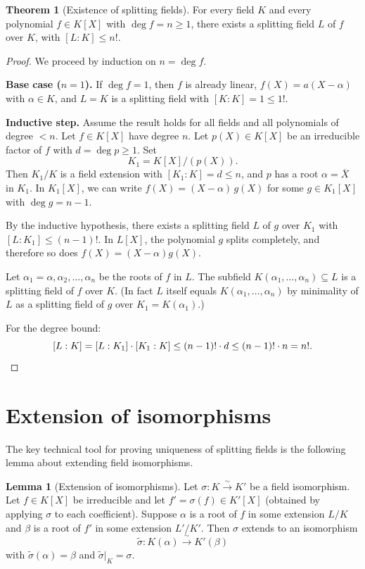 \documentclass[12pt,a4paper,openany]{book}
\theoremstyle{definition}
\newtheorem{theorem}{Theorem}[chapter]
\newtheorem{lemma}{Lemma}[chapter]
\theoremstyle{remark}
\renewcommand{\deg}{\operatorname{deg}}
\begin{document}
\begin{theorem}[Existence of splitting fields]
\label{thm:splitting-existence}
For every field $K$ and every polynomial $f \in K[X]$ with
$\deg f = n \ge 1$, there exists a splitting field $L$ of $f$ over
$K$, with $[L:K] \le n!$.
\end{theorem}

\begin{proof}
We proceed by induction on $n = \deg f$.

\textbf{Base case ($n = 1$).} If $\deg f = 1$, then $f$ is already
linear, $f(X) = a(X - \alpha)$ with $\alpha \in K$, and $L = K$ is a
splitting field with $[K:K] = 1 \le 1!$.

\textbf{Inductive step.} Assume the result holds for all fields and
all polynomials of degree $< n$. Let $f \in K[X]$ have degree $n$.
Let $p(X) \in K[X]$ be an irreducible factor of $f$ with
$d = \deg p \ge 1$. Set
\[
  K_1 = K[X]/(p(X)).
\]
Then $K_1/K$ is a field extension with $[K_1:K] = d \le n$, and $p$
has a root $\alpha = \overline{X}$ in $K_1$. In $K_1[X]$, we can
write $f(X) = (X - \alpha)\,g(X)$ for some $g \in K_1[X]$ with
$\deg g = n - 1$.

By the inductive hypothesis, there exists a splitting field $L$ of
$g$ over $K_1$ with $[L:K_1] \le (n-1)!$. In $L[X]$, the polynomial
$g$ splits completely, and therefore so does $f(X) = (X-\alpha)g(X)$.

Let $\alpha_1 = \alpha, \alpha_2, \dots, \alpha_n$ be the roots of
$f$ in $L$. The subfield $K(\alpha_1, \dots, \alpha_n) \subseteq L$
is a splitting field of $f$ over $K$. (In fact $L$ itself equals
$K(\alpha_1, \dots, \alpha_n)$ by minimality of $L$ as a splitting
field of $g$ over $K_1 = K(\alpha_1)$.)

For the degree bound:
\[
  [L:K] = [L:K_1]\cdot[K_1:K] \le (n-1)!\cdot d \le (n-1)!\cdot n
  = n!. \qedhere
\]
\end{proof}

\section{Extension of isomorphisms}
\label{sec:extension-iso}

The key technical tool for proving uniqueness of splitting fields is
the following lemma about extending field isomorphisms.

\begin{lemma}[Extension of isomorphisms]
\label{lem:extension-iso}
Let $\sigma \colon K \xrightarrow{\sim} K'$ be a field isomorphism.
Let $f \in K[X]$ be irreducible and let $f' = \sigma(f) \in K'[X]$
(obtained by applying $\sigma$ to each coefficient). Suppose
$\alpha$ is a root of $f$ in some extension $L/K$ and $\beta$ is a
root of $f'$ in some extension $L'/K'$. Then $\sigma$ extends to an
isomorphism
\[
  \tilde{\sigma} \colon K(\alpha) \xrightarrow{\;\sim\;} K'(\beta)
\]
with $\tilde{\sigma}(\alpha) = \beta$ and
$\tilde{\sigma}|_K = \sigma$.
\end{lemma}
\end{document}
